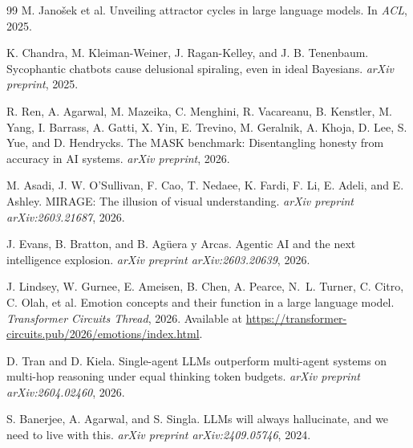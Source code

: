 \documentclass[11pt,a4paper]{article}
\begin{document}
\begin{thebibliography}{99}
M. Jano\v{s}ek et al.
Unveiling attractor cycles in large language models.
In \textit{ACL}, 2025.

K. Chandra, M. Kleiman-Weiner, J. Ragan-Kelley, and J. B. Tenenbaum.
Sycophantic chatbots cause delusional spiraling, even in ideal Bayesians.
\textit{arXiv preprint}, 2025.

R. Ren, A. Agarwal, M. Mazeika, C. Menghini, R. Vacareanu, B. Kenstler,
M. Yang, I. Barrass, A. Gatti, X. Yin, E. Trevino, M. Geralnik, A. Khoja,
D. Lee, S. Yue, and D. Hendrycks.
The {MASK} benchmark: Disentangling honesty from accuracy in {AI} systems.
\textit{arXiv preprint}, 2026.

M. Asadi, J. W. O'Sullivan, F. Cao, T. Nedaee, K. Fardi, F. Li, E. Adeli,
and E. Ashley.
{MIRAGE}: The illusion of visual understanding.
\textit{arXiv preprint arXiv:2603.21687}, 2026.

J. Evans, B. Bratton, and B. Ag\"{u}era y Arcas.
Agentic {AI} and the next intelligence explosion.
\textit{arXiv preprint arXiv:2603.20639}, 2026.

J. Lindsey, W. Gurnee, E. Ameisen, B. Chen, A. Pearce, N.~L. Turner,
C. Citro, C. Olah, et al.
Emotion concepts and their function in a large language model.
\textit{Transformer Circuits Thread}, 2026.
Available at \url{https://transformer-circuits.pub/2026/emotions/index.html}.

D. Tran and D. Kiela.
Single-agent {LLMs} outperform multi-agent systems on multi-hop reasoning
under equal thinking token budgets.
\textit{arXiv preprint arXiv:2604.02460}, 2026.

S. Banerjee, A. Agarwal, and S. Singla.
{LLMs} will always hallucinate, and we need to live with this.
\textit{arXiv preprint arXiv:2409.05746}, 2024.

\end{thebibliography}
\end{document}
